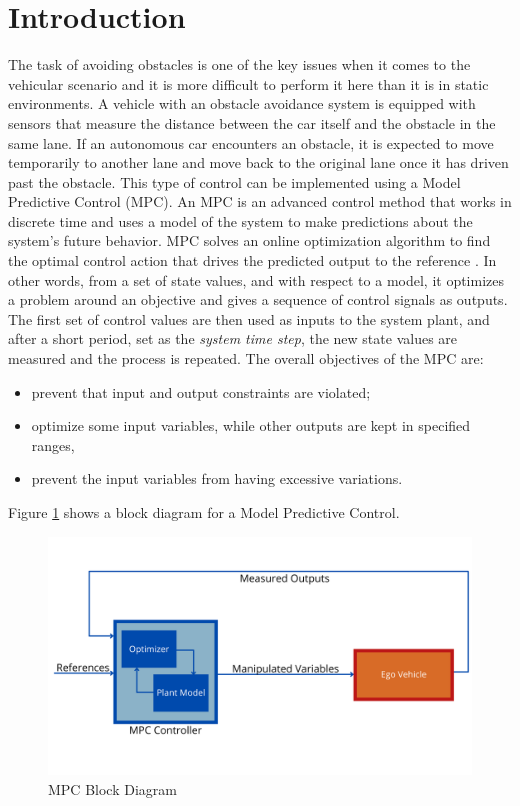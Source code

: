 \section{Introduction}
\label{sec:intro}
The task of avoiding obstacles is one of the key issues when it comes to the vehicular scenario and it is more difficult to perform it here than it is in static environments.
A vehicle with an obstacle avoidance system is equipped with sensors that measure the distance between the car itself and the obstacle in the same lane. If an autonomous car encounters an obstacle, it is expected to move temporarily to another lane and move back to the original lane once it has driven past the obstacle. This type of control can be implemented using a Model Predictive Control (MPC).
An MPC is an advanced control method that works in discrete time and uses a model of the system to make predictions about the system’s future behavior. MPC solves an online optimization algorithm to find the optimal control action that drives the predicted output to the reference \cite{MPC_Def}.  In other words, from a set of state values, and with respect to a model, it optimizes a problem around an objective and gives a sequence of control signals as outputs. The first set of control values are then used as inputs to the system plant, and after a short period, set as the \emph{system time step}, the new state values are measured and the process is repeated.
The overall objectives of the MPC are:
\begin{itemize}
 

\item prevent that input and output constraints are violated;
\item optimize some input variables, while other outputs are kept in specified ranges,
\item prevent the input variables from having excessive variations.
\end{itemize}
Figure \ref{fig:MPC_Block} shows a block diagram for a Model Predictive Control.
\begin{figure}[H]
    \centering
    \includegraphics[width=1\textwidth]{Figures/mpcblock.png}
    \caption{MPC Block Diagram}
      \label{fig:MPC_Block}
\end{figure}
